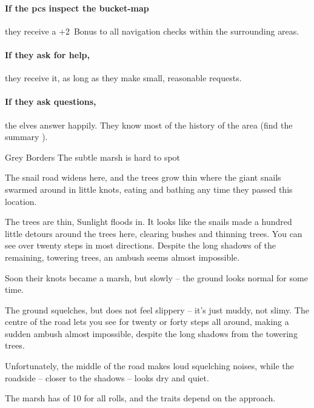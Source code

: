 \paragraph{If the \glspl{pc} inspect the bucket-map}
they receive a +2~Bonus to all \gls{navigation} checks within the surrounding \glspl{area}.

\paragraph{If they ask for help,}
they receive it, as long as they make small, reasonable requests.

\paragraph{If they ask questions,}
the elves answer happily.
They know most of the history of the area (find the summary ).

{Grey Borders}%
{The subtle marsh is hard to spot}%

The snail road widens here, and the trees grow thin where the giant snails swarmed around in little knots, eating and bathing any time they passed this location.

\begin{boxtext}
  The trees are thin, Sunlight floods in.
  It looks like the snails made a hundred little detours around the trees here, clearing bushes and thinning trees.
  You can see over twenty \glspl{step} in most directions.
  Despite the long shadows of the remaining, towering trees, an ambush seems almost impossible.
\end{boxtext}

Soon their knots became a marsh, but slowly -- the ground looks normal for some time.

\begin{boxtext}
  The ground squelches, but does not feel slippery -- it's just muddy, not slimy.
  The centre of the road lets you see for twenty or forty \glspl{step} all around, making a sudden ambush almost impossible, despite the long shadows from the towering trees.

  Unfortunately, the middle of the road makes loud squelching noises, while the roadside -- closer to the shadows -- looks dry and quiet.
\end{boxtext}

The marsh has  of 10 for all rolls, and the \glspl{trait} depend on the approach.

